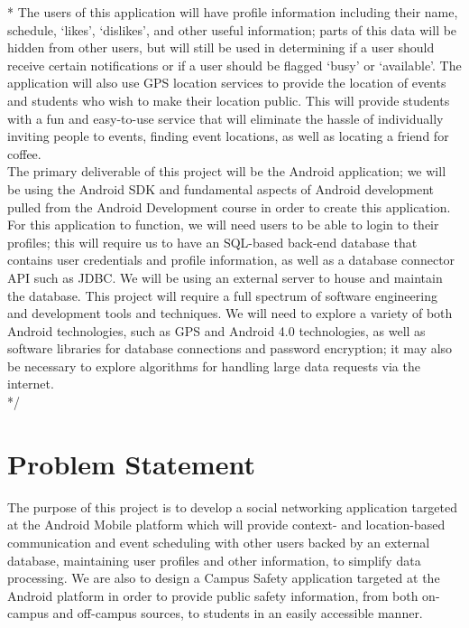 \documentclass[11pt]{article}
\begin{document}
\/* The users of this application will have profile information including their 
name, schedule, `likes', `dislikes', and other useful information; parts of 
this data will be hidden from other users, but will still be used in determining if a 
user should receive certain notifications or if a user should be flagged 
`busy' or `available'.
The application will also use GPS location services to provide the 
location of events and students who wish to make their location public. This 
will provide students with a fun and easy-to-use service that will eliminate 
the hassle of individually inviting people to events, finding event locations, 
as well as locating a friend for coffee.\\

The primary deliverable of this project will be the Android application; we 
will be using the Android SDK and fundamental aspects of Android development 
pulled from the Android Development course in order to create this application. 
For this application to function, we will need users to be able to login to 
their profiles; this will require us to have an SQL-based back-end database 
that contains user credentials and profile information, as well as a database 
connector API such as JDBC. We will be using an external server to house and 
maintain the database.  This project will require a full spectrum of 
software engineering and development tools and techniques. We will need to 
explore a variety of both Android technologies, such as GPS and Android 4.0 
technologies, as well as software libraries for database connections and 
password encryption; it may also be necessary to explore algorithms for 
handling large data requests via the internet.\\ */


\section{Problem Statement}

The purpose of this project is to develop a social networking application 
targeted at the Android Mobile platform which will provide context- and 
location-based communication and event scheduling with other users backed by 
an external database, maintaining user profiles and 
other information, to simplify data processing. We are also to design a 
Campus Safety application targeted at the Android platform in order to provide
public safety information, from both on-campus and off-campus sources, 
to students in an easily accessible manner.
\end{document}
